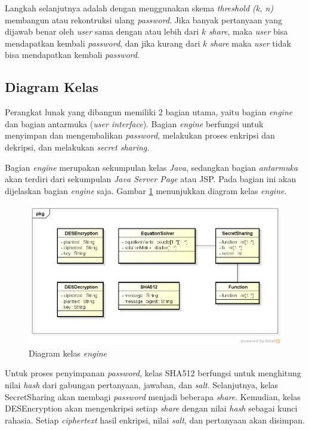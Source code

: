 Langkah selanjutnya adalah dengan menggunakan skema \textit{threshold (k, n)} membangun atau rekontruksi ulang \textit{password}. Jika banyak pertanyaan yang dijawab benar oleh \textit{user} sama dengan atau lebih dari \begin{math}k\end{math} \textit{share}, maka \textit{user} bisa mendapatkan kembali \textit{password}, dan jika kurang dari \begin{math}k\end{math} \textit{share} maka \textit{user} tidak bisa mendapatkan kembali \textit{password}.

\subsection{Diagram Kelas}

Perangkat lunak yang dibangun memiliki 2 bagian utama, yaitu bagian \textit{engine} dan bagian antarmuka (\textit{user interface}). Bagian \textit{engine} berfungsi untuk menyimpan dan mengembalikan \textit{password}, melakukan proses enkripsi dan dekripsi, dan melakukan \textit{secret sharing}.

Bagian \textit{engine} merupakan sekumpulan kelas \textit{Java}, sedangkan bagian \textit{antarmuka} akan terdiri dari sekumpulan \textit{Java Server Page} atau JSP. Pada bagian ini akan dijelaskan bagian \textit{engine} saja. Gambar \ref{fig:diagramkelasengine} menunjukkan diagram kelas \textit{engine}.

\begin{figure}[H]
	\centerline{\includegraphics[scale=0.6]{Gambar/engine-class-diagram}}
	\caption{Diagram kelas \textit{engine}}\label{fig:diagramkelasengine}
\end{figure}

Untuk proses penyimpanan \textit{password}, kelas SHA512 berfungsi untuk menghitung nilai \textit{hash} dari gabungan pertanyaan, jawaban, dan \textit{salt}. Selanjutnya, kelas SecretSharing akan membagi \textit{password} menjadi beberapa \textit{share}. Kemudian, kelas DESEncryption akan mengenkripsi setiap \textit{share} dengan nilai \textit{hash} sebagai kunci rahasia. Setiap \textit{ciphertext} hasil enkripsi, nilai \textit{salt}, dan pertanyaan akan disimpan.

